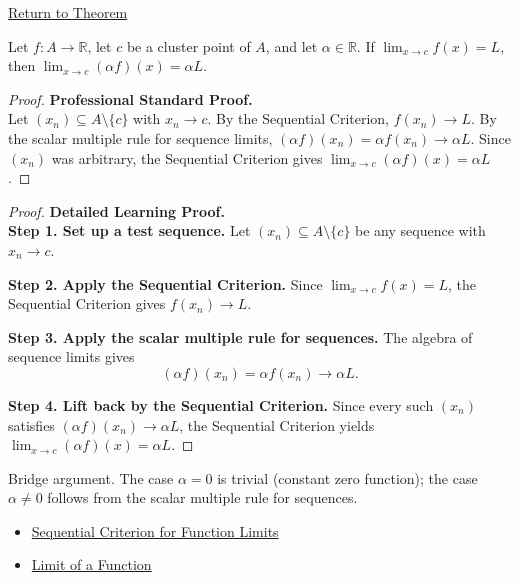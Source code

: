 \newpage
{}
\label{prf:limit-scalar-multiple}

\begin{remark*}[Return]
\hyperref[thm:limit-scalar-multiple]{Return to Theorem}
\end{remark*}

\begin{theorem*}
Let $f : A \to \mathbb{R}$, let $c$ be a cluster point of $A$, and let
$\alpha \in \mathbb{R}$. If $\lim_{x\to c}f(x)=L$, then
$\lim_{x\to c}(\alpha f)(x) = \alpha L$.
\end{theorem*}

\begin{proof}
\textbf{Professional Standard Proof.}~\\
Let $(x_n) \subseteq A \setminus \{c\}$ with $x_n \to c$.
By the Sequential Criterion, $f(x_n) \to L$.
By the scalar multiple rule for sequence limits, $(\alpha f)(x_n) = \alpha f(x_n) \to \alpha L$.
Since $(x_n)$ was arbitrary, the Sequential Criterion gives
$\lim_{x\to c}(\alpha f)(x) = \alpha L$.
\end{proof}

\begin{proof}
\textbf{Detailed Learning Proof.}~\\
\textbf{Step 1. Set up a test sequence.}
Let $(x_n) \subseteq A \setminus \{c\}$ be any sequence with $x_n \to c$.

\textbf{Step 2. Apply the Sequential Criterion.}
Since $\lim_{x\to c}f(x)=L$, the Sequential Criterion gives $f(x_n) \to L$.

\textbf{Step 3. Apply the scalar multiple rule for sequences.}
The algebra of sequence limits gives
\[
  (\alpha f)(x_n) = \alpha f(x_n) \to \alpha L.
\]

\textbf{Step 4. Lift back by the Sequential Criterion.}
Since every such $(x_n)$ satisfies $(\alpha f)(x_n) \to \alpha L$, the
Sequential Criterion yields $\lim_{x\to c}(\alpha f)(x) = \alpha L$.
\end{proof}

\begin{remark*}
Bridge argument. The case $\alpha = 0$ is trivial (constant zero function);
the case $\alpha \neq 0$ follows from the scalar multiple rule for sequences.
\end{remark*}

\begin{remark*}[Dependencies]
\begin{itemize}
  \item \hyperref[prop:sequential-criterion-limits]{Sequential Criterion for Function Limits}
  \item \hyperref[def:limit-function]{Limit of a Function}
\end{itemize}
\end{remark*}

